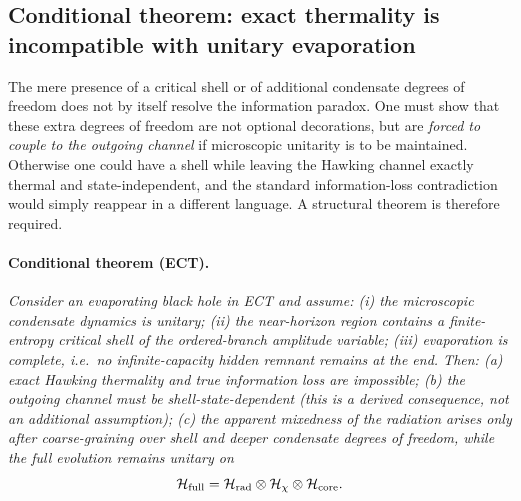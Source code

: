 \documentclass[11pt,a4paper]{article}
\numberwithin{equation}{section}
\begin{document}
\subsection{Conditional theorem: exact thermality is incompatible with unitary evaporation}
\label{app:conditional_theorem}


The mere presence of a critical shell or of additional condensate degrees of
freedom does not by itself resolve the information paradox.
One must show that these extra degrees of freedom are not optional
decorations, but are \emph{forced to couple to the outgoing channel} if
microscopic unitarity is to be maintained.
Otherwise one could have a shell while leaving the Hawking channel exactly
thermal and state-independent, and the standard information-loss contradiction
would simply reappear in a different language.
A structural theorem is therefore required.


\paragraph{Conditional theorem (ECT).}
\textit{
Consider an evaporating black hole in ECT and assume:
(i) the microscopic condensate dynamics is unitary;
(ii) the near-horizon region contains a finite-entropy critical shell of
     the ordered-branch amplitude variable;
(iii) evaporation is complete, i.e.\ no infinite-capacity hidden remnant
      remains at the end.
Then: (a) exact Hawking thermality and true information loss are impossible;
(b) the outgoing channel must be shell-state-dependent (this is a derived
consequence, not an additional assumption);
(c) the apparent mixedness of the radiation arises only after coarse-graining
over shell and deeper condensate degrees of freedom, while the full evolution
remains unitary on
\begin{equation}
  \label{eq:Hilbert_full}
  \mathcal{H}_{\rm full}
  = \mathcal{H}_{\rm rad}\otimes\mathcal{H}_{\chi}\otimes\mathcal{H}_{\rm core}.
\end{equation}}

\end{document}
